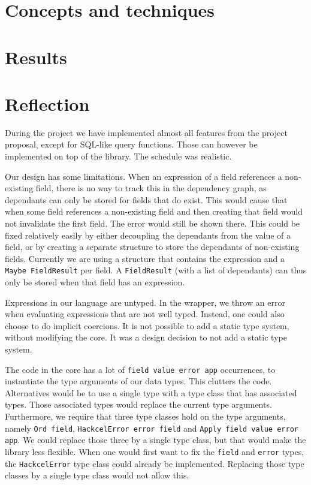 \documentclass{article}
\begin{document}
	\section{Concepts and techniques}
	
	\section{Results}
	
	\section{Reflection}
	During the project we have implemented almost all features from the project proposal, except for SQL-like query functions. Those can however be implemented on top of the library. The schedule was realistic.
	
	Our design has some limitations. When an expression of a field references a non-existing field, there is no way to track this in the dependency graph, as dependants can only be stored for fields that do exist. This would cause that when some field references a non-existing field and then creating that field would not invalidate the first field. The error would still be shown there. This could be fixed relatively easily by either decoupling the dependants from the value of a field, or by creating a separate structure to store the dependants of non-existing fields. Currently we are using a structure that contains the expression and a \texttt{Maybe FieldResult} per field. A \texttt{FieldResult} (with a list of dependants) can thus only be stored when that field has an expression.
	
	Expressions in our language are untyped. In the wrapper, we throw an error when evaluating expressions that are not well typed. Instead, one could also choose to do implicit coercions. It is not possible to add a static type system, without modifying the core. It was a design decision to not add a static type system.
	
	The code in the core has a lot of \texttt{field value error app} occurrences, to instantiate the type arguments of our data types. This clutters the code. Alternatives would be to use a single type with a type class that has associated types. Those associated types would replace the current type arguments. Furthermore, we require that three type classes hold on the type arguments, namely \texttt{Ord field}, \texttt{HackcelError error field} and \texttt{Apply field value error app}. We could replace those three by a single type class, but that would make the library less flexible. When one would first want to fix the \texttt{field} and \texttt{error} types, the \texttt{HackcelError} type class could already be implemented. Replacing those type classes by a single type class would not allow this.
	
\end{document}
